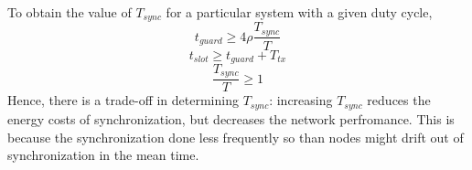 \documentclass[a4paper,10pt]{report}
\begin{document}
\paragraph*{}
To obtain the value of $T_{sync}$ for a particular system with a given duty cycle,
\begin{equation}
t_{guard} \geq 4\rho \frac{T_{sync}}{T}
\end{equation}
\begin{equation}
t_{slot} \geq t_{guard} + T_{tx}
\end{equation}
\begin{equation}
\frac{T_{sync}}{T} \geq 1
\end{equation}
Hence, there is a trade-off in determining $T_{sync}$: increasing $T_{sync}$ reduces the energy costs of synchronization, but decreases the network perfromance. This is because the synchronization done less frequently so than nodes might drift out of synchronization in the mean time.
\end{document}
